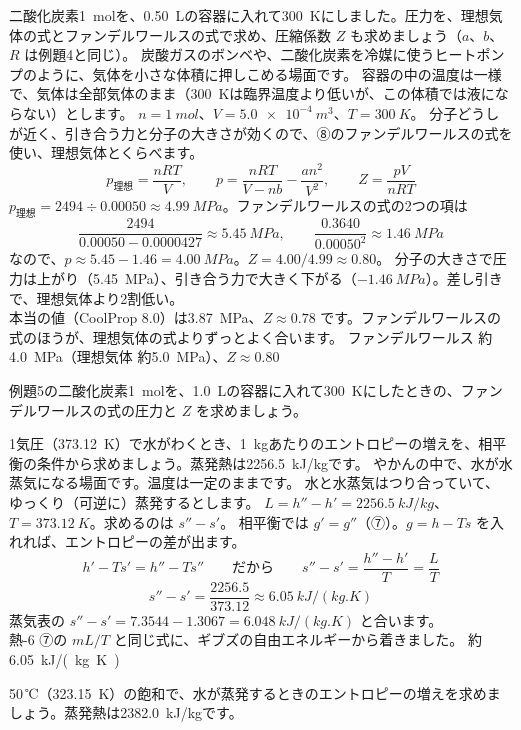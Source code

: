 \label{ph:熱-10:ex5}
\begin{phreidai}
二酸化炭素\qty{1}{mol}を、\qty{0.50}{L}の容器に入れて\qty{300}{K}にしました。圧力を、理想気体の式とファンデルワールスの式で求め、圧縮係数 $Z$ も求めましょう（$a$、$b$、$R$ は例題4と同じ）。
\phbamen
炭酸ガスのボンベや、二酸化炭素を冷媒に使うヒートポンプのように、気体を小さな体積に押しこめる場面です。
\phmushi
容器の中の温度は一様で、気体は全部気体のまま（\qty{300}{K}は臨界温度より低いが、この体積では液にならない）とします。
\phzu
$n=\qty{1}{mol}$、$V=\qty{5.0e-4}{m^3}$、$T=\qty{300}{K}$。
\phriyu
分子どうしが近く、引き合う力と分子の大きさが効くので、⑧のファンデルワールスの式を使い、理想気体とくらべます。
\phtateru
\[p_{\text{理想}}=\frac{nRT}{V},\qquad p=\frac{nRT}{V-nb}-\frac{an^2}{V^2},\qquad Z=\frac{pV}{nRT}\]
\phtoku
$p_{\text{理想}}=2494\div0.00050\approx\qty{4.99}{MPa}$。ファンデルワールスの式の2つの項は
\[\frac{2494}{0.00050-0.0000427}\approx\qty{5.45}{MPa},\qquad\frac{0.3640}{0.00050^2}\approx\qty{1.46}{MPa}\]
なので、$p\approx5.45-1.46=\qty{4.00}{MPa}$。$Z=4.00/4.99\approx0.80$。
\phtashikame
分子の大きさで圧力は上がり（\qty{5.45}{MPa}）、引き合う力で大きく下がる（$\qty{-1.46}{MPa}$）。差し引きで、理想気体より2割低い。\\
本当の値（CoolProp 8.0）は\qty{3.87}{MPa}、$Z\approx0.78$ です。ファンデルワールスの式のほうが、理想気体の式よりずっとよく合います。
\kotae ファンデルワールス 約\qty{4.0}{MPa}（理想気体 約\qty{5.0}{MPa}）、$Z\approx0.80$
\end{phreidai}
\begin{jibun}
例題5の二酸化炭素\qty{1}{mol}を、\qty{1.0}{L}の容器に入れて\qty{300}{K}にしたときの、ファンデルワールスの式の圧力と $Z$ を求めましょう。
\end{jibun}

\label{ph:熱-10:ex6}
\begin{phreidai}[わくときのエントロピーの増え]
1気圧（\qty{373.12}{K}）で水がわくとき、\qty{1}{kg}あたりのエントロピーの増えを、相平衡の条件から求めましょう。蒸発熱は\qty{2256.5}{kJ/kg}です。
\phbamen
やかんの中で、水が水蒸気になる場面です。温度は一定のままです。
\phmushi
水と水蒸気はつり合っていて、ゆっくり（可逆に）蒸発するとします。
\phzu
$L=h''-h'=\qty{2256.5}{kJ/kg}$、$T=\qty{373.12}{K}$。求めるのは $s''-s'$。
\phriyu
相平衡では $g'=g''$（⑦）。$g=h-Ts$ を入れれば、エントロピーの差が出ます。
\phtateru
\[h'-Ts'=h''-Ts''\qquad\text{だから}\qquad s''-s'=\frac{h''-h'}{T}=\frac{L}{T}\]
\phtoku
\[s''-s'=\frac{2256.5}{373.12}\approx\qty{6.05}{kJ/(kg.K)}\]
\phtashikame
蒸気表の $s''-s'=7.3544-1.3067=\qty{6.048}{kJ/(kg.K)}$ と合います。\\
熱-6 ⑦の $mL/T$ と同じ式に、ギブズの自由エネルギーから着きました。
\kotae 約\qty{6.05}{kJ/(kg.K)}
\end{phreidai}
\begin{jibun}
50\,℃（\qty{323.15}{K}）の飽和で、水が蒸発するときのエントロピーの増えを求めましょう。蒸発熱は\qty{2382.0}{kJ/kg}です。
\end{jibun}

